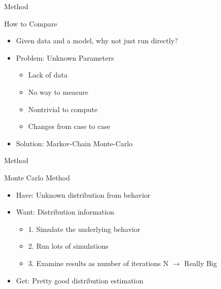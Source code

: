 \documentclass[t,10pt,fleqn]{beamer}
\begin{document}
\begin{frame}{Method}
	\vspace{-.3cm}
	\begin{block}{How to Compare}
		\begin{itemize}
			\pause
			\item Given data and a model, why not just run directly?
			      \pause
			\item Problem: Unknown Parameters
			      \pause
			      \begin{itemize}
				      \item Lack of data
				            \pause
				      \item No way to measure
				            \pause
				      \item Nontrivial to compute
				            \pause
				      \item Changes from case to case
				            \pause
			      \end{itemize}
			\item Solution: Markov-Chain Monte-Carlo
		\end{itemize}
	\end{block}

\end{frame}



\begin{frame}{Method}
	\vspace{-.3cm}
	\begin{block}{Monte Carlo Method}
		\begin{itemize}
			\pause
			\item Have: Unknown distribution from behavior
			      \pause
			\item Want: Distribution information
			      \pause
			      \begin{itemize}
				      \item 1. Simulate the underlying behavior
				            \pause
				      \item 2. Run lots of simulations
				            \pause
				      \item 3. Examine results as number of iterations N $\rightarrow$ Really Big
				            \pause
			      \end{itemize}
			\item Get: Pretty good distribution estimation
		\end{itemize}
	\end{block}
\end{frame}
\end{document}
